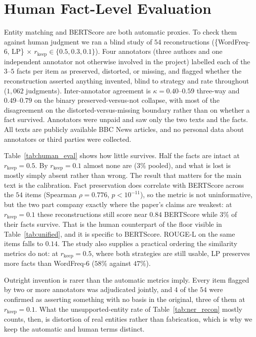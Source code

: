 \documentclass[11pt]{article}
\newcommand{\rkeep}{r_{\mathrm{keep}}}
\begin{document}
\section{Human Fact-Level Evaluation}
\label{app:human_eval}

Entity matching and BERTScore are both automatic proxies. To check them against human judgment we ran a
blind study of $54$ reconstructions (\{WordFreq-6, LP\} $\times$ $\rkeep \in \{0.5, 0.3, 0.1\}$). Four annotators (three authors and one independent annotator not otherwise involved in the project) labelled each of the $3$--$5$ facts per item as preserved, distorted, or missing, and flagged whether the
reconstruction asserted anything invented, blind to strategy and rate throughout ($1{,}062$ judgments).
Inter-annotator agreement is $\kappa = 0.40$--$0.59$ three-way and $0.49$--$0.79$ on the binary
preserved-versus-not collapse, with most of the disagreement on the distorted-versus-missing boundary
rather than on whether a fact survived. Annotators were unpaid and saw only the two texts and the facts. All texts are publicly available BBC News articles, and no personal data about annotators or third parties
were collected.

Table~\ref{tab:human_eval} shows how little survives. Half the facts are intact at $\rkeep = 0.5$. By $\rkeep = 0.1$ almost none are ($3\%$ pooled), and what is lost is mostly simply absent rather than wrong.
The result that matters for the main text is the calibration. Fact preservation does correlate with
BERTScore across the $54$ items (Spearman $\rho = 0.776$, $p < 10^{-11}$), so the metric is not uninformative, but the two part company exactly where the paper's claims are weakest: at $\rkeep = 0.1$
these reconstructions still score near $0.84$ BERTScore while $3\%$ of their facts survive. That is the
human counterpart of the floor visible in Table~\ref{tab:unified}, and it is specific to BERTScore. ROUGE-L on the same items falls to $0.14$. The study also supplies a practical ordering the similarity metrics do
not: at $\rkeep = 0.5$, where both strategies are still usable, LP preserves more facts than WordFreq-6
($58\%$ against $47\%$).

Outright invention is rarer than the automatic metrics imply. Every item flagged by two or more annotators
was adjudicated jointly, and $4$ of the $54$ were confirmed as asserting something with no basis in the
original, three of them at $\rkeep = 0.1$. What the unsupported-entity rate of Table~\ref{tab:ner_recon}
mostly counts, then, is distortion of real entities rather than fabrication, which is why we keep the
automatic and human terms distinct.
\end{document}
